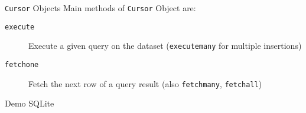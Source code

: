\begin{frame}{\texttt{Cursor} Objects}\label{dbapi:cursor}
  Main methods of \texttt{Cursor} Object are:
  \begin{description}
    \item[\texttt{execute}] Execute a given query on the dataset (\texttt{executemany} for multiple insertions)
    \item[\texttt{fetchone}] Fetch the next row of a query result (also \texttt{fetchmany}, \texttt{fetchall})
  \end{description} 

\end{frame}

\begin{frame}{Demo SQLite}
\end{frame}
